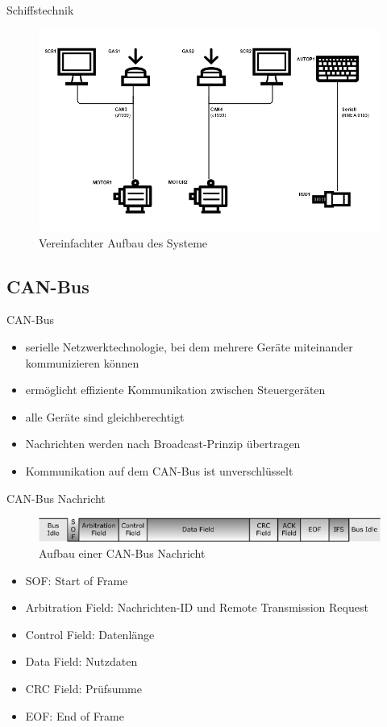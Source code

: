 \documentclass[usenames, dvipsnames, aspectratio=75]{beamer}
\begin{document}
\begin{frame}{Schiffstechnik}
    \begin{figure}
        \centering
        \includegraphics[width=1\linewidth]{assets/limanda_system.png}
        \caption{Vereinfachter Aufbau des Systeme}
    \end{figure}
\end{frame}

\subsection{CAN-Bus}
\begin{frame}{CAN-Bus}
    \begin{itemize}
        \item serielle Netzwerktechnologie, bei dem mehrere Geräte miteinander kommunizieren können
        \item ermöglicht effiziente Kommunikation zwischen Steuergeräten
        \item alle Geräte sind gleichberechtigt
        \item Nachrichten werden nach Broadcast-Prinzip übertragen
        \item Kommunikation auf dem CAN-Bus ist unverschlüsselt
    \end{itemize}
\end{frame}

\begin{frame}{CAN-Bus Nachricht}
    \begin{figure}
        \centering
        \includegraphics[width=0.9\linewidth]{assets/canMessage.png}
        \caption{Aufbau einer CAN-Bus Nachricht}
    \end{figure}
    \begin{itemize}
        \item SOF: Start of Frame
        \item Arbitration Field: Nachrichten-ID und Remote Transmission Request
        \item Control Field: Datenlänge
        \item Data Field: Nutzdaten
        \item CRC Field: Prüfsumme
        \item EOF: End of Frame
    \end{itemize}
\end{frame}
\end{document}
